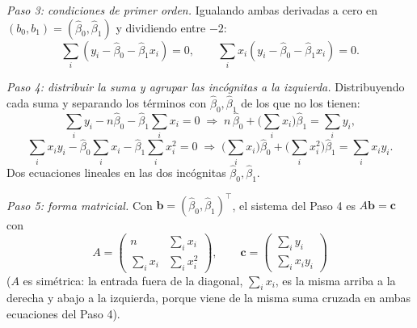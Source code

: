 \documentclass[11pt,a4paper,oneside]{article}
\theoremstyle{plain}
\theoremstyle{definition}
\begin{document}
\emph{Paso 3: condiciones de primer orden.} Igualando ambas derivadas a
cero en $(b_0,b_1)=(\hat\beta_0,\hat\beta_1)$ y dividiendo entre $-2$:
\[
  \sum_i(y_i-\hat\beta_0-\hat\beta_1x_i)=0, \qquad
  \sum_ix_i(y_i-\hat\beta_0-\hat\beta_1x_i)=0.
\]

\emph{Paso 4: distribuir la suma y agrupar las incógnitas a la
izquierda.} Distribuyendo cada suma y separando los términos con
$\hat\beta_0,\hat\beta_1$ de los que no los tienen:
\[
  \sum_iy_i-n\hat\beta_0-\hat\beta_1\sum_ix_i=0
  \;\Longrightarrow\;
  n\,\hat\beta_0 + \Big(\sum_ix_i\Big)\hat\beta_1 = \sum_iy_i,
\]
\[
  \sum_ix_iy_i-\hat\beta_0\sum_ix_i-\hat\beta_1\sum_ix_i^2=0
  \;\Longrightarrow\;
  \Big(\sum_ix_i\Big)\hat\beta_0+\Big(\sum_ix_i^2\Big)\hat\beta_1=\sum_ix_iy_i.
\]
Dos ecuaciones lineales en las dos incógnitas $\hat\beta_0,\hat\beta_1$.

\emph{Paso 5: forma matricial.} Con $\mathbf b=(\hat\beta_0,\hat\beta_1)^\top$,
el sistema del Paso 4 es $A\mathbf b=\mathbf c$ con
\[
  A=\begin{pmatrix} n & \displaystyle\sum_ix_i \\[4pt]
  \displaystyle\sum_ix_i & \displaystyle\sum_ix_i^2\end{pmatrix}, \qquad
  \mathbf c=\begin{pmatrix}\displaystyle\sum_iy_i\\[4pt] \displaystyle\sum_ix_iy_i\end{pmatrix}
\]
($A$ es simétrica: la entrada fuera de la diagonal, $\sum_ix_i$, es la
misma arriba a la derecha y abajo a la izquierda, porque viene de la
misma suma cruzada en ambas ecuaciones del Paso 4).
\end{document}

